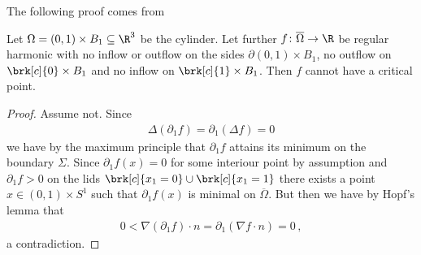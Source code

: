 The following proof comes from \cite{Wahlen2023}
\begin{proposition}
  Let $\Omega=(0,1)\times B_1\subseteq\R^3$ be the cylinder. Let further $f\colon\overline{\Omega}\to\R$ be regular 
  harmonic with no inflow or outflow on the sides 
  $\partial (0,1)\times B_1$, no outflow on $\brk[c]{0}\times B_1$ and no inflow on $\brk[c]{1}\times B_1$. 
  Then $f$ cannot have a critical point.
\end{proposition}
\begin{proof}
  Assume not. Since
  \begin{align*}
    \Delta(\partial_1f)=\partial_1(\Delta f)=0
  \end{align*}
  we have by the maximum principle that $\partial_1 f$ attains its minimum on the boundary $\Sigma$. Since $\partial_1 f(x)=0$ for some interiour point 
  by assumption and $\partial_1 f>0$ on the lids $\brk[c]{x_1=0}\cup\brk[c]{x_1=1}$ there exists a point
  $x\in(0,1)\times S^1$ such that $\partial_1f(x)$ is minimal on $\overline{\Omega}$. But then we have by Hopf's lemma
  that
  \begin{align*}
    0<\nabla (\partial_1f)\cdot n=\partial_1(\nabla f\cdot n)=0\,,
  \end{align*}
  a contradiction.
\end{proof}

\newpage

